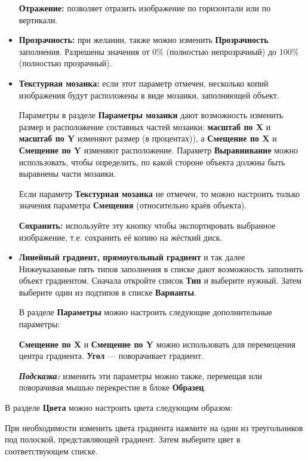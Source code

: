 ﻿\documentclass[a4paper,10pt]{article}
\begin{document}
\begin{itemize}
  \textbf{Отражение:} позволяет отразить изображение по горизонтали или по вертикали.
  
  \item \textbf{Прозрачность:} при желании, также можно изменить \textbf{Прозрачность} заполнения. Разрешены значения от 0\% (полностью непрозрачный) до 100\% (полностью прозрачный).
  \item \textbf{Текстурная мозаика:} если этот параметр отмечен, несколько копий изображения будут расположены в виде мозаики, заполняющей объект.
  
  Параметры в разделе \textbf{Параметры мозаики} дают возможность изменить размер и расположение составных частей мозаики: \textbf{масштаб по X} и \textbf{масштаб по Y} изменяют размер (в процентах)), а \textbf{Смещение по X} и \textbf{Смещение по Y} изменяют расположение. Параметр \textbf{Выравнивание} можно использовать, чтобы определить, по какой стороне объекта должны быть выравнены части мозаики.
  
  Если параметр \textbf{Текстурная мозаика} не отмечен, то можно настроить только значения параметра \textbf{Смещения} (относительно краёв объекта).
  
  \textbf{Сохранить:} используйте эту кнопку чтобы экспортировать выбранное изображение, т.е. сохранить её копию на жёсткий диск.
  \item \textbf{Линейный градиент, прямоугольный градиент} и так далее\\
  Нижеуказанные пять типов заполнения в списке дают возможность заполнить объект градиентом. Сначала откройте список \textbf{Тип} и выберите нужный. Затем выберите один из подтипов в списке \textbf{Варианты}.
  
  В разделе \textbf{Параметры} можно настроить следующие дополнительные параметры:
  
  \textbf{Смещение по X} и \textbf{Смещение по Y} можно использовать для перемещения центра градиента. \textbf{Угол} — поворачивает градиент.
  
  \begin{mdframed}[backgroundcolor=blue!10]
\textbf{\textit{Подсказка:}} изменить эти параметры можно также, перемещая или поворачивая мышью перекрестие в блоке \textbf{Образец}.
\end{mdframed}
\end{itemize}

В разделе \textbf{Цвета} можно настроить цвета следующим образом:

При необходимости изменить цвета градиента нажмите на один из треугольников под полоской, представляющей градиент. Затем выберите цвет в соответствующем списке.
\end{document}
